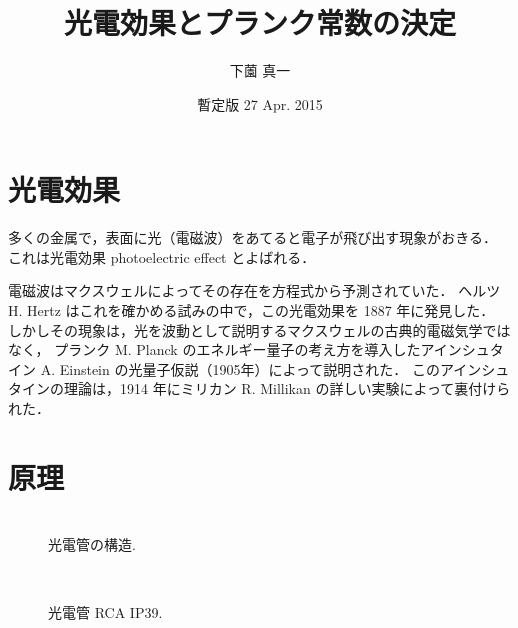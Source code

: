 \documentclass[11pt,sort]{jarticle}
\title{光電効果とプランク常数の決定}
\author{下薗 真一}
\date{暫定版 27 Apr. 2015}
\begin{document}
\maketitle

\section{光電効果}

多くの金属で，表面に光（電磁波）をあてると電子が飛び出す現象がおきる．
これは光電効果 photoelectric effect とよばれる．

電磁波はマクスウェルによってその存在を方程式から予測されていた．
ヘルツ H. Hertz はこれを確かめる試みの中で，この光電効果を 1887 年に発見した．
しかしその現象は，光を波動として説明するマクスウェルの古典的電磁気学ではなく，
プランク M. Planck のエネルギー量子の考え方を導入したアインシュタイン A. Einstein の光量子仮説（1905年）\cite{Einstein-1905-ap891}によって説明された．
このアインシュタインの理論は，1914 年にミリカン R. Millikan の詳しい実験によって裏付けられた．

\section{原理}

\begin{figure}[t]
\begin{minipage}[t]{.4\textwidth}
\begin{center}
\\
\caption{光電管の構造. }\label{fig:phototube} 
\end{center}
\end{minipage}
\hfill
\begin{minipage}[t]{.5\textwidth}
\begin{center}
\\
\caption{光電管 RCA IP39. }\label{fig:IP39} 
\end{center}
\end{minipage}
\end{figure}
\end{document}
